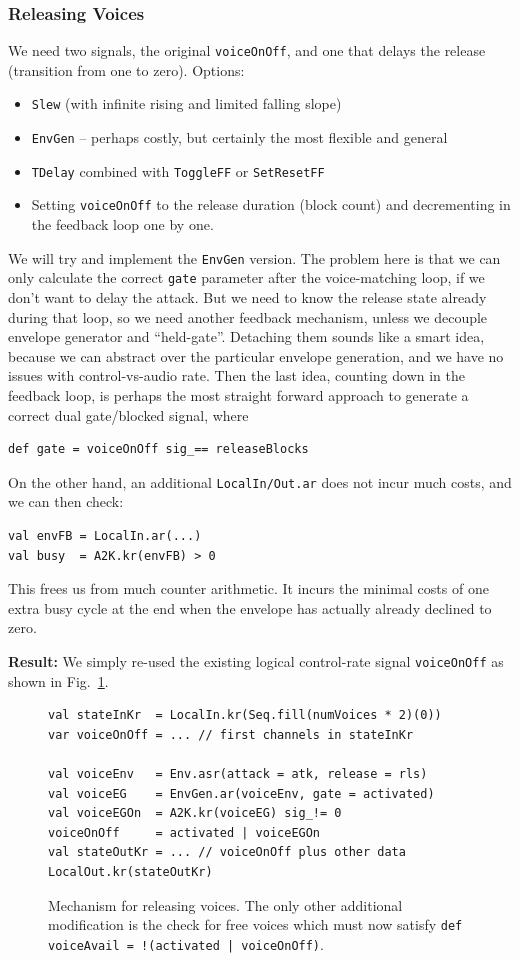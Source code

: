 \documentclass[11pt,a4paper]{article}
\newcommand{\figref}[1]{Fig.~\ref{#1}}
\begin{document}
\subsubsection*{Releasing Voices}

We need two signals, the original \Verb!voiceOnOff!, and one that delays the release (transition from one to zero). Options:
%
\begin{itemize}
\item \Verb!Slew! (with infinite rising and limited falling slope)
\item \Verb!EnvGen! -- perhaps costly, but certainly the most flexible and general
\item \Verb!TDelay! combined with \Verb!ToggleFF! or \Verb!SetResetFF!
\item Setting \Verb!voiceOnOff! to the release duration (block count) and decrementing in the feedback loop one by one.
\end{itemize}
%
We will try and implement the \Verb!EnvGen! version. The problem here is that we can only calculate the correct \Verb!gate! parameter after the voice-matching loop, if we don't want to delay the attack. But we need to know the release state already during that loop, so we need another feedback mechanism, unless we decouple envelope generator and ``held-gate''. Detaching them sounds like a smart idea, because we can abstract over the particular envelope generation, and we have no issues with control-vs-audio rate. Then the last idea, counting down in the feedback loop, is perhaps the most straight forward approach to generate a correct dual gate/blocked signal, where 
%
\begin{verbatim}
def gate = voiceOnOff sig_== releaseBlocks
\end{verbatim}
%
On the other hand, an additional \Verb!LocalIn/Out.ar! does not incur much costs, and we can then check:
%
\begin{verbatim}
val envFB = LocalIn.ar(...)
val busy  = A2K.kr(envFB) > 0
\end{verbatim}
%
This frees us from much counter arithmetic. It incurs the minimal costs of one extra busy cycle at the end when the envelope has actually already declined to zero.

\textbf{Result:} We simply re-used the existing logical control-rate signal \Verb!voiceOnOff! as shown in \figref{fig:voices-release}.

\begin{figure}
\begin{lstlisting}[style=scala]
val stateInKr  = LocalIn.kr(Seq.fill(numVoices * 2)(0))
var voiceOnOff = ... // first channels in stateInKr

val voiceEnv   = Env.asr(attack = atk, release = rls)
val voiceEG    = EnvGen.ar(voiceEnv, gate = activated)
val voiceEGOn  = A2K.kr(voiceEG) sig_!= 0
voiceOnOff     = activated | voiceEGOn
val stateOutKr = ... // voiceOnOff plus other data
LocalOut.kr(stateOutKr)
\end{lstlisting}
\caption{Mechanism for releasing voices. The only other additional modification is the check for free voices which must now satisfy \texttt{def voiceAvail = !(activated | voiceOnOff)}.}
\label{fig:voices-release}
\end{figure}
\end{document}
